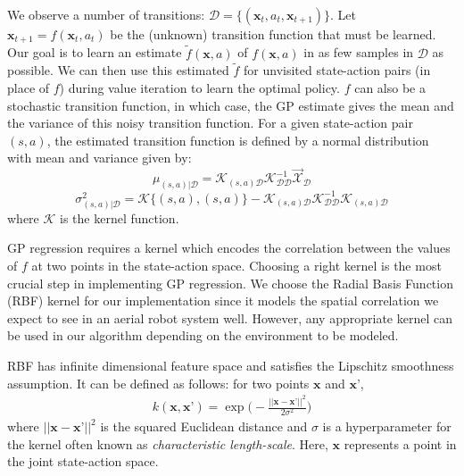 \documentclass[12pt]{report}
\begin{document}
We observe a number of transitions: $\mathcal{D} = \{(\textbf{x}_t, a_t, \textbf{x}_{t+1})\}$. Let $\textbf{x}_{t+1} = f(\textbf{x}_t, a_t)$ be the (unknown) transition function that must be learned. Our goal is to learn an estimate $\tilde{f}(\textbf{x}, a)$ of $f(\textbf{x}, a)$ in as few samples in $\mathcal{D}$ as possible. We can then use this estimated $\tilde{f}$ for unvisited state-action pairs (in place of $f$) during value iteration to learn the optimal policy. $f$ can also be a stochastic transition function, in which case, the GP estimate gives the mean and the variance of this noisy transition function. For a given state-action pair $(s,a)$, the estimated transition function is defined by a normal distribution with mean and variance given by:
\begin{equation}\label{gaussian_mean}
\mu_{(s,a)|\mathcal{D}} = \mathcal{K}_{(s,a)\mathcal{D}}\mathcal{K}^{-1}_{\mathcal{D}\mathcal{D}}\vec{\mathcal{X}}_{\mathcal{D}} 
\end{equation}
\begin{equation}\label{gaussian_variance}
\sigma^2_{(s,a)|\mathcal{D}} = \mathcal{K}\{(s,a),(s,a)\}-\mathcal{K}_{(s,a)\mathcal{D}}\mathcal{K}^{-1}_{\mathcal{D}\mathcal{D}}\mathcal{K}_{(s,a)\mathcal{D}}
\end{equation}
where $\mathcal{K}$ is the kernel function.

GP regression requires a kernel which encodes the correlation between the values of $f$ at two points in the state-action space. Choosing a right kernel is the most crucial step in implementing GP regression. We choose the Radial Basis Function (RBF) kernel for our implementation since it models the spatial correlation we expect to see in an aerial robot system well. However, any appropriate kernel can be used in our algorithm depending on the environment to be modeled. 

RBF has infinite dimensional feature space and satisfies the Lipschitz smoothness assumption. It can be defined as follows: for two points $\textbf{x}$ and $\textbf{x'}$,
\begin{equation} \label{kernel_def}
\begin{split}
k(\textbf{x}, \textbf{x'})= \exp\bigg(-\frac{|| \textbf{x}-\textbf{x'}||^2}{2\sigma^2}\bigg)\end{split}
\end{equation}
where $||\textbf{x}-\textbf{x'}||^{2}$ is the squared Euclidean distance and $\sigma$ is a hyperparameter for the kernel often known as \textit{characteristic length-scale}. Here, $\textbf{x}$ represents a point in the joint state-action space.
\end{document}
